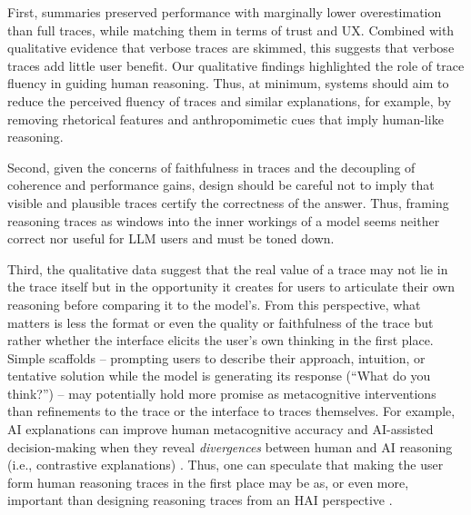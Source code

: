 \documentclass[manuscript,review,anonymous]{acmart}
\let\xtodo\todo
\renewcommand{\todo}[1]{\xtodo[inline,color=green!50]{#1}}
\newcommand{\todoshort}[1]{\xtodo[inline,color=cyan!30]{\textbf{SHORTER:} #1}}
\begin{document}
First, summaries preserved performance with marginally lower overestimation than full traces, while matching them in terms of trust and UX. Combined with qualitative evidence that verbose traces are skimmed, this suggests that verbose traces add little user benefit. Our qualitative findings highlighted the role of trace fluency in guiding human reasoning. Thus, at minimum, systems should aim to reduce the perceived fluency of traces and similar explanations, for example, by removing rhetorical features and anthropomimetic cues that imply human-like reasoning. 


Second, given the concerns of faithfulness in traces and the decoupling of coherence and performance gains, design should be careful not to imply that visible and plausible traces certify the correctness of the answer. Thus, framing reasoning traces as windows into the inner workings of a model seems neither correct \cite{10.5555/3666122.3669397,lindsey2025biology, barez2025chain} nor useful for LLM users and must be toned down.%

Third, the qualitative data suggest that the real value of a trace may not lie in the trace itself but in the opportunity it creates for users to articulate their own reasoning before comparing it to the model's. From this perspective, what matters is less the format or even the quality or faithfulness of the trace but rather whether the interface elicits the user's own thinking in the first place. Simple scaffolds -- 
prompting users to describe their approach, intuition, or tentative solution while the model is generating its response (``What do you think?'') -- may potentially hold more promise as metacognitive interventions than refinements to the trace or the interface to traces themselves. For example, AI explanations can improve human metacognitive accuracy and AI-assisted decision-making when they reveal \textit{divergences} between human and AI reasoning (i.e., contrastive explanations) \cite{von2025knowing, buccinca2025contrastive, si2024large}. Thus, one can speculate that making the user form human reasoning traces in the first place may be as, or even more, important than designing reasoning traces from an HAI perspective \cite{FERNANDES2026108779}.
\end{document}
